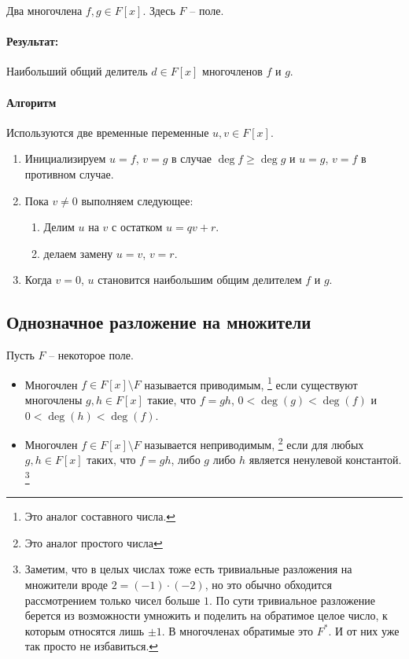 Два многочлена $f, g\in F[x]$.
Здесь $F$ -- поле.

\paragraph{Результат:}

Наибольший общий делитель $d\in F[x]$ многочленов $f$ и $g$.

\paragraph{Алгоритм}

Используются две временные переменные $u, v\in F[x]$.

\begin{enumerate}
\item Инициализируем $u = f$, $v = g$ в случае $\deg f \geqslant \deg g$ и $u = g$, $v = f$ в противном случае.

\item Пока $v \neq 0$ выполняем следующее:
\begin{enumerate}
\item Делим $u$ на $v$ с остатком $u = q v + r$.

\item делаем замену $u = v$, $v = r$.
\end{enumerate}

\item Когда $v = 0$, $u$ становится наибольшим общим делителем $f$ и $g$.
\end{enumerate}

\subsection{Однозначное разложение на множители}

\begin{definition}
\label{def::IrreduciblePolyOneVar}
Пусть $F$ -- некоторое поле.
\begin{itemize}
\item Многочлен $ f\in F[x]\setminus F$ называется приводимым,%
\footnote{Это аналог составного числа.}
если существуют многочлены $g,h\in F[x]$ такие, что $f = gh$, $0<\deg (g) < \deg (f)$ и $0 < \deg(h) < \deg(f)$.

\item Многочлен $f\in F[x]\setminus F$ называется неприводимым,%
\footnote{Это аналог простого числа}
если для любых $g,h\in F[x]$ таких, что $f = gh$, либо $g$ либо $h$ является ненулевой константой.%
\footnote{Заметим, что в целых числах тоже есть тривиальные разложения на множители вроде $2 = (-1) \cdot (- 2)$, но это обычно обходится рассмотрением только чисел больше $1$.
По сути тривиальное разложение берется из возможности умножить и поделить на обратимое целое число, к которым относятся лишь $\pm 1$.
В многочленах обратимые это $F^*$.
И от них уже так просто не избавиться.}
\end{itemize}
\end{definition}

